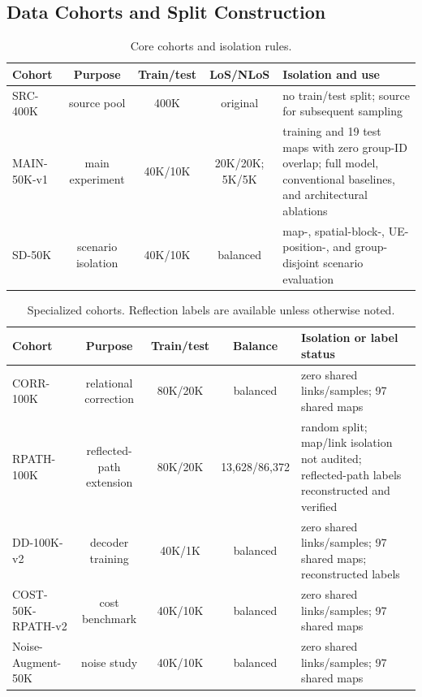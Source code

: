 \subsection{Data Cohorts and Split Construction}

\begin{table}[t]
\centering
\caption{Core cohorts and isolation rules.}
\label{tab:cohort-core}
\scriptsize
\setlength{\tabcolsep}{4pt}
\begin{tabular}{lccc>{\centering\arraybackslash}p{5.2cm}}
\toprule
Cohort & Purpose & Train/test & LoS/NLoS & Isolation and use \\
\midrule
SRC-400K & source pool & 400K & original & no train/test split; source for subsequent sampling \\
MAIN-50K-v1 & main experiment & 40K/10K & 20K/20K; 5K/5K & 78 training and 19 test maps with zero group-ID overlap; full model, conventional baselines, and architectural ablations \\
SD-50K & scenario isolation & 40K/10K & balanced & map-, spatial-block-, UE-position-, and group-disjoint scenario evaluation \\
\bottomrule
\end{tabular}
\end{table}

\begin{table}[t]
\centering
\caption{Specialized cohorts. Reflection labels are available unless otherwise noted.}
\label{tab:cohort-specialized}
\scriptsize
\setlength{\tabcolsep}{3.5pt}
\begin{tabular}{lccc>{\centering\arraybackslash}p{4.5cm}}
\toprule
Cohort & Purpose & Train/test & Balance & Isolation or label status \\
\midrule
CORR-100K & relational correction & 80K/20K & balanced & zero shared links/samples; 97 shared maps \\
RPATH-100K & reflected-path extension & 80K/20K & 13,628/86,372 & random split; map/link isolation not audited; reflected-path labels reconstructed and verified \\
DD-100K-v2 & decoder training & 40K/1K & balanced & zero shared links/samples; 97 shared maps; reconstructed labels \\
COST-50K-RPATH-v2 & cost benchmark & 40K/10K & balanced & zero shared links/samples; 97 shared maps \\
Noise-Augment-50K & noise study & 40K/10K & balanced & zero shared links/samples; 97 shared maps \\
\bottomrule
\end{tabular}
\end{table}


